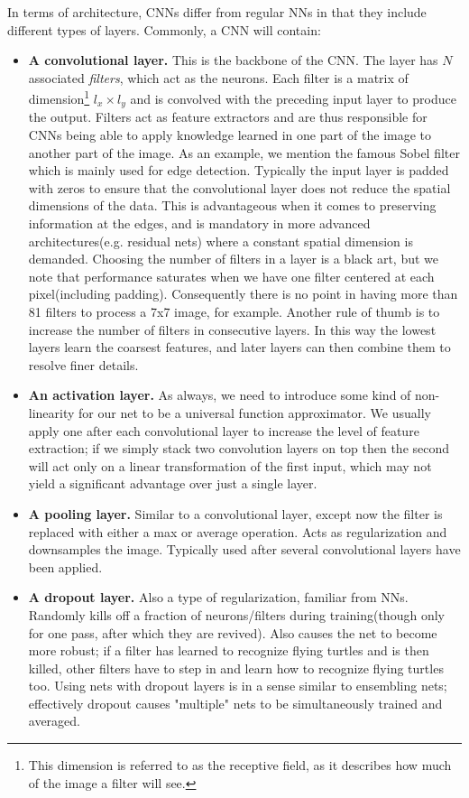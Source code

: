 \documentclass[]{article}
\begin{document}
In terms of architecture, CNNs differ from regular NNs in that they include different types of layers. Commonly, a CNN will contain:
\begin{itemize}
	\item[1)] \textbf{A convolutional layer.} This is the backbone of the CNN. The layer has $N$ associated \textit{filters}, which act as the neurons. Each filter is a matrix of dimension\footnote{This dimension is referred to as the receptive field, as it describes how much of the image a filter will see.} $l_x\times l_y$ and is convolved with the preceding input layer to produce the output. Filters act as feature extractors and are thus responsible for CNNs being able to apply knowledge learned in one part of the image to another part of the image. As an example, we mention the famous Sobel filter which is mainly used for edge detection.  Typically the input layer is padded with zeros to ensure that the convolutional layer does not reduce the spatial dimensions of the data. This is advantageous when it comes to preserving information at the edges, and is mandatory in more advanced architectures(e.g. residual nets) where a constant spatial dimension is demanded. Choosing the number of filters in a layer is a black art, but we note that performance saturates when we have one filter centered at each pixel(including padding). Consequently there is no point in having more than 81 filters to process a 7x7 image, for example. Another rule of thumb is to increase the number of filters in consecutive layers. In this way the lowest layers learn the coarsest features, and later layers can then combine them to resolve finer details.
	\item[2)] \textbf{An activation layer.} As always, we need to introduce some kind of non-linearity for our net to be a universal function approximator. We usually apply one after each convolutional layer to increase the level of feature extraction; if we simply stack two convolution layers on top then the second will act only on a linear transformation of the first input, which may not yield a significant advantage over just a single layer. 
	\item[3)] \textbf{A pooling layer.} Similar to a convolutional layer, except now the filter is replaced with either a max or average operation. Acts as regularization and downsamples the image. Typically used after several convolutional layers have been applied. 
	\item[4)] \textbf{A dropout layer.} Also a type of regularization, familiar from NNs. Randomly kills off a fraction of neurons/filters during training(though only for one pass, after which they are revived). Also causes the net to become more robust; if a filter has learned to recognize flying turtles and is then killed, other filters have to step in and learn how to recognize flying turtles too. Using nets with dropout layers is in a sense similar to ensembling nets; effectively dropout causes "multiple" nets to be simultaneously trained and averaged.\cite{Hinton2012ImprovingNN}

\end{itemize}
\end{document}

